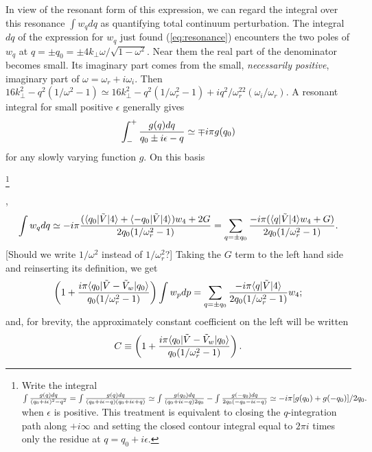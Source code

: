 \documentclass[12pt]{article}
\def\ket#1{|#1\rangle}
\def\bra#1{\langle#1}
\begin{document}
In view of the resonant form of this expression, we can regard the
integral over this resonance $\int w_q dq$ as quantifying total
continuum perturbation.  The integral $dq$ of the expression for $w_q$
just found (\ref{eq:resonance}) encounters the two poles of $w_q$ at
$q=\pm q_0=\pm4k_\perp\omega/\sqrt{1-\omega^2}$. Near them the real
part of the denominator becomes small. Its imaginary part comes from
the small, \emph{necessarily positive}, imaginary part of
$\omega=\omega_r+i\omega_i$. Then
$16k_\perp^2-q^2(1/\omega^2-1)\simeq 16k_\perp^2-q^2(1/\omega_r^2-1)
+iq^2/\omega_r^22(\omega_i/\omega_r)$.  A resonant integral for small
positive $\epsilon$ generally gives
\begin{equation}
  \label{resint}
  \int_{-}^{+} {g(q) dq\over q_0\pm i\epsilon-q}\simeq \mp i\pi g(q_0)
\end{equation}
for any slowly varying function $g$. On this basis
\iftrue
\footnote{Write the integral $\int{g(q)dq\over
  (q_0+i\epsilon)^2-q^2}=\int{g(q)dq\over 
(q_0+i\epsilon-q)(q_0+i\epsilon+q)}\simeq \int{g(q_0)dq\over
  (q_0+i\epsilon-q)2q_0}-\int{g(-q_0)dq\over
  2q_0(-q_0-i\epsilon-q) }\simeq -i\pi [g(q_0)+g(-q_0)]/2q_0. $ when
 $\epsilon$ is
positive. This treatment is equivalent to closing the $q$-integration path
along $+i\infty$ and setting the closed contour integral equal to
$2\pi i$ times only the residue at $q=q_0+i\epsilon$.}
\fi
,
\begin{equation}
  \label{poles}
  \int w_q dq \simeq -i\pi {(\bra{q_0}|\tilde{V}\ket{4}
    +\bra{-q_0}|\tilde{V}\ket{4})w_4+2G
    \over
    2q_0(1/\omega_r^2-1)
  }
  =\sum_{q=\pm q_0}{-i\pi(\bra{q}|\tilde{V}\ket{4}w_4+G)
    \over
    2q_0(1/\omega_r^2-1)}.
\end{equation}
[Should we write $1/\omega^2$ instead of $1/\omega_r^2$?]
Taking the $G$ term to the left hand side and reinserting its definition, we get
\begin{equation}
  \label{eq:22}
\left(1+{i\pi \bra{q_0}|\tilde{V}-\tilde{V}_{w}\ket{q_0}\over q_0(1/\omega_r^2-1)}\right)\int w_pdp  =\sum_{q=\pm q_0}{-i\pi\bra{q}|\tilde{V}\ket{4}  \over
    2q_0(1/\omega_r^2-1)}w_4;
\end{equation}
and, for brevity, the approximately constant coefficient on the left will
be written
\begin{equation}
  \label{eq:23}
  C \equiv \left(1+{i\pi\bra{q_0}|\tilde{V}-\tilde{V}_{w}\ket{q_0}\over q_0(1/\omega_r^2-1)}\right).
\end{equation}
\end{document}
